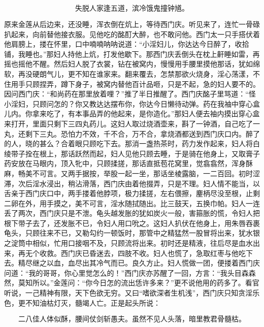 \[
失脱人家逢五道，滨冷饿鬼撞钟馗。
\]

原来金莲从后边来，还没睡，浑衣倒在炕上，等待西门庆。听见来了，连忙一骨碌扒起来，向前替他接衣服。见他吃的酩酊大醉，也不敢问他。西门太一只手搭伏着他肩膀上，搂在怀里，口中喃喃呐呐说道：“小淫妇儿，你达达今日醉了，收拾铺，我睡也。”那妇人持他上炕，打发他歇下。那西门庆丢倒头在枕上鼾睡如雷，再摇也摇他不醒。然后妇人脱了衣裳，钻在被窝内，慢慢用手腰里摸他那话，犹如绵软，再没硬朗气儿，更不知在谁家来。翻来覆去，怎禁那欲火烧身，淫心荡漾，不住用手只顾捏弄，蹲下身子，被窝内替他百计品咂，只是不起，急的妇人要不的。因问西门庆：“和尚药在那里放着哩？”推了半日推醒了。西门庆酩子里骂道：“怪小淫妇，只顾问怎的？你又教达达摆布你，你达今日懒待动弹。药在我袖中穿心盒儿内。你拿来吃了，有本事品弄的他起来，是你造化。”那妇人便去袖内摸出穿心盒来打开，里面只剩下三四丸药儿。这妇人取过烧酒壶来，斟了一钟酒，自己吃了一丸，还剩下三丸。恐怕力不效，千不合，万不合，拿烧酒都送到西门庆口内。醉了的人，晓的甚么？合着眼只顾吃下去。那消一盏热茶时，药力发作起来，妇人将白绫带子拴在根上，那话跃然而起，妇人见他只顾去睡，于是骑在他身上，又取膏子药安放在马眼内，顶入牝中，只顾揉搓，那话直抵苞花窝里，觉翕翕然，浑身酥麻，畅美不可言。又两手据按，举股一起一坐，那话坐棱露脑，一二百回。初时涩滞，次后淫水浸出，稍沾滑落，西门庆由着他掇弄，只是不理。妇人情不能当，以舌亲于西门庆口中，两手搂着他脖项，极力揉搓，左右偎擦，麈柄尽没至根，止剩二卵在外，用手摸之，美不可言，淫水随拭随出。比三鼓天，五换巾帕。妇人一连丢了两次，西门庆只是不泄。龟头越发胀的犹如炭火一般，害箍胀的慌，令妇人把根下带子去了，还发胀不已，令妇人用口吮之。这妇人扒伏在他身上，用朱唇吞裹龟头，只顾往来不已，又勒勾约一顿饭时，那管中之精猛然一股冒将出来，犹水银之淀筒中相似，忙用口接咽不及，只顾流将出来。初时还是精液，往后尽是血水出来，再无个收救。西门庆已昏迷去，四肢不收。妇人也慌了，急取红枣与他吃下去。精尽继之以血，血尽出其冷气而已。良久方止。妇人慌做一团，便搂着西门庆问道：“我的哥哥，你心里觉怎么的！”西门庆亦苏醒了一回，方言：“我头目森森然，莫知所以。”金莲问：“你今日怎的流出恁许多来？”更不说他用的药多了。看官听说，一己精神有限，天下色欲无穷。又曰“嗜欲深者生机浅”，西门庆只知贪淫乐色，更不知油枯灯灭，髓竭人亡。正是起头所说：

\[
二八佳人体似酥，腰间仗剑斩愚夫。
虽然不见人头落，暗里教君骨髓枯。
\]

